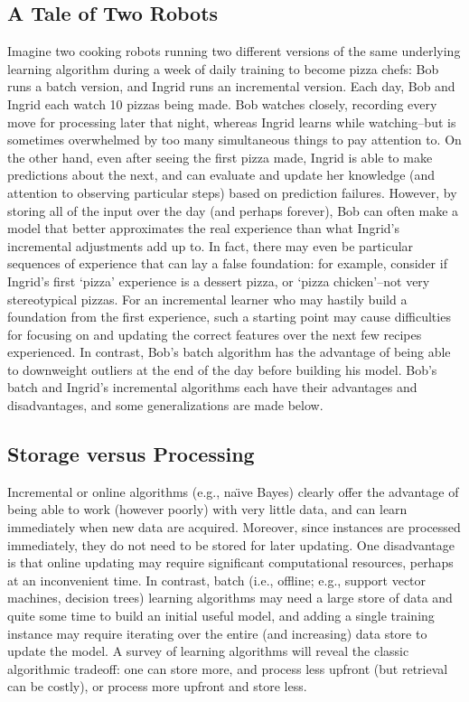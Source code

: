 \documentclass[10pt,letterpaper]{article}
\begin{document}
\subsection{A Tale of Two Robots}
\vspace{-.1cm}
Imagine two cooking robots running two different versions of the same underlying learning algorithm during a week of daily training to become pizza chefs: Bob runs a batch version, and Ingrid runs an incremental version. Each day, Bob and Ingrid each watch 10 pizzas being made. Bob watches closely, recording every move for processing later that night, whereas Ingrid learns while watching--but is sometimes overwhelmed by too many simultaneous things to pay attention to. On the other hand, even after seeing the first pizza made, Ingrid is able to make predictions about the next, and can evaluate and update her knowledge (and attention to observing particular steps) based on prediction failures. However, by storing all of the input over the day (and perhaps forever), Bob can often make a model that better approximates the real experience than what Ingrid's incremental adjustments add up to. In fact, there may even be particular sequences of experience that can lay a false foundation: for example, consider if Ingrid's first `pizza' experience is a dessert pizza, or `pizza chicken'--not very stereotypical pizzas. For an incremental learner who may hastily build a foundation from the first experience, such a starting point may cause difficulties for focusing on and updating the correct features over the next few recipes experienced. In contrast, Bob's batch algorithm has the advantage of being able to downweight outliers at the end of the day before building his model. Bob's batch and Ingrid's incremental algorithms each have their advantages and disadvantages, and some generalizations are made below.

\subsection{Storage versus Processing}

Incremental or online algorithms (e.g., na\"{\i}ve Bayes) clearly offer the advantage of being able to work (however poorly) with very little data, and can learn immediately when new data are acquired. Moreover, since instances are processed immediately, they do not need to be stored for later updating. One disadvantage is that online updating may require significant computational resources, perhaps at an inconvenient time. In contrast, batch (i.e., offline; e.g., support vector machines, decision trees) learning algorithms may need a large store of data and quite some time to build an initial useful model, and adding a single training instance may require iterating over the entire (and increasing) data store to update the model. A survey of learning algorithms will reveal the classic algorithmic tradeoff: one can store more, and process less upfront (but retrieval can be costly), or process more upfront and store less.
\end{document}
